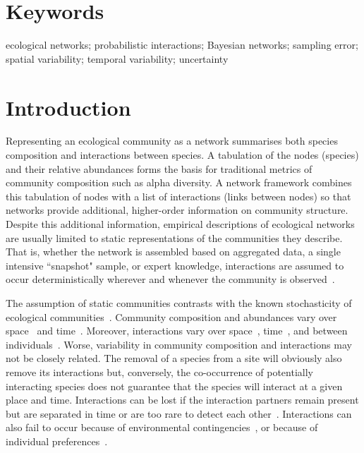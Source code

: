 \documentclass[12pt]{article}
\begin{document}
\begin{spacing}{2.0}
\section*{\small Keywords}

ecological networks; probabilistic interactions; Bayesian networks; sampling error; spatial variability; temporal variability; uncertainty

\clearpage

\section*{Introduction}

    Representing an ecological community as a network summarises both species composition and interactions between species. A tabulation of the nodes (species) and their relative abundances forms the basis for traditional metrics of community composition such as alpha diversity. A network framework combines this tabulation of nodes with a list of interactions (links between nodes) so that networks provide additional, higher-order information on community structure. Despite this additional information, empirical descriptions of ecological networks are usually limited to static representations of the communities they describe. That is, whether the network is assembled based on aggregated data, a single intensive ``snapshot" sample, or expert knowledge, interactions are assumed to occur deterministically wherever and whenever the community is observed~\citep{Olesen2011a}. 


    The assumption of static communities contrasts with the known stochasticity of ecological communities~\citep{Gotelli2000}. Community composition and abundances vary over space~\citep{Baiser2012} and time~\citep{Olesen2011a}. Moreover, interactions vary over space~\citep{Kitching1987,Baiser2012}, time~\citep{Kitching1987,Olesen2011a}, and between individuals~\citep{Pires2011a,Fodrie2015,Novak2015}. Worse, variability in community composition and interactions may not be closely related. The removal of a species from a site will obviously also remove its interactions but, conversely, the co-occurrence of potentially interacting species does not guarantee that the species will interact at a given place and time. Interactions can be lost if the interaction partners remain present but are separated in time or are too rare to detect each other~\citep{Tylianakis2010}. Interactions can also fail to occur because of environmental contingencies~\citep{Poisot2015}, or because of individual preferences~\citep{Fodrie2015}. 



\end{spacing}
\end{document}
